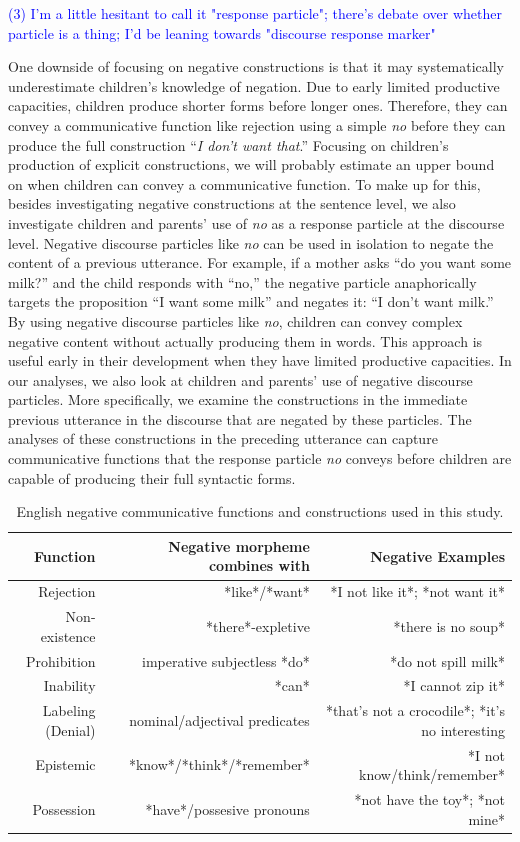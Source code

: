 \documentclass[
  english,
  man,floatsintext]{apa6}
\begin{document}
\textcolor{blue}{(3) I'm a little hesitant to call it "response particle"; there's debate over whether particle is a thing; I'd be leaning towards "discourse response marker"}

One downside of focusing on negative constructions is that it may systematically underestimate children's knowledge of negation. Due to early limited productive capacities, children produce shorter forms before longer ones. Therefore, they can convey a communicative function like rejection using a simple \emph{no} before they can produce the full construction ``\emph{I don't want that}.'' Focusing on children's production of explicit constructions, we will probably estimate an upper bound on when children can convey a communicative function. To make up for this, besides investigating negative constructions at the sentence level, we also investigate children and parents' use of \emph{no} as a response particle at the discourse level. Negative discourse particles like \emph{no} can be used in isolation to negate the content of a previous utterance. For example, if a mother asks ``do you want some milk?'' and the child responds with ``no,'' the negative particle anaphorically targets the proposition ``I want some milk'' and negates it: ``I don't want milk.'' By using negative discourse particles like \emph{no}, children can convey complex negative content without actually producing them in words. This approach is useful early in their development when they have limited productive capacities. In our analyses, we also look at children and parents' use of negative discourse particles. More specifically, we examine the constructions in the immediate previous utterance in the discourse that are negated by these particles. The analyses of these constructions in the preceding utterance can capture communicative functions that the response particle \emph{no} conveys before children are capable of producing their full syntactic forms.

\begin{table}[h]
\small
\centering
\begin{tabular}{rrr}
\hline
\textbf{Function} & \textbf{Negative morpheme combines with} & \textbf{Negative Examples} \\
\hline
Rejection & *like*/*want* & *I not like it*; *not want it* \\
Non-existence & *there*-expletive & *there is no soup*  \\
Prohibition & imperative subjectless *do* & *do not spill milk* \\
Inability & *can* & *I cannot zip it*  \\
Labeling (Denial) & nominal/adjectival predicates & *that's not a crocodile*; *it's no interesting  \\
Epistemic & *know*/*think*/*remember*  & *I not know/think/remember*  \\
Possession & *have*/possesive pronouns & *not have the toy*; *not mine*  \\
\hline
\end{tabular}
\caption{English negative communicative functions and constructions used in this study.}
\end{table}
\end{document}
